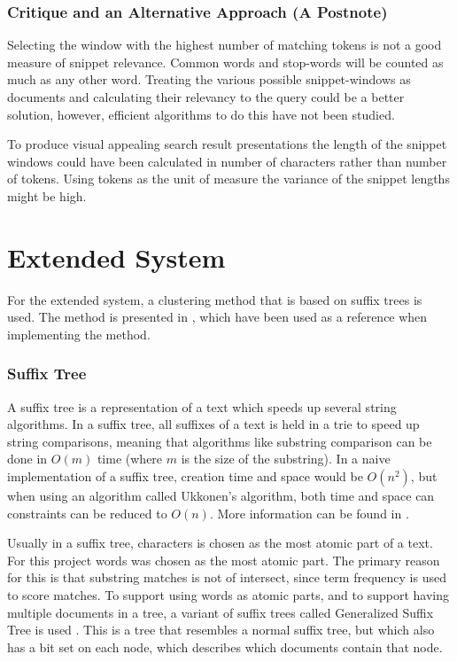 \subsubsection{Critique and an Alternative Approach (A Postnote)}
Selecting the window with the highest number of matching tokens is not a good measure of snippet relevance. Common words and stop-words will be counted as much as any other word. Treating the various possible snippet-windows as documents and calculating their relevancy to the query could be a better solution, however, efficient algorithms to do this have not been studied. 

To produce visual appealing search result presentations the length of the snippet windows could have been calculated in number of characters rather than number of tokens. Using tokens as the unit of measure the variance of the snippet lengths might be high. 

\section{Extended System}

For the extended system, a clustering method that is based on suffix trees is used. The method is presented in \cite{zamir}, which have been used as a reference when implementing the method.

\subsubsection{Suffix Tree} 

A suffix tree is a representation of a text which speeds up several string algorithms. In a suffix tree, all suffixes of a text is held in  a trie to speed up string comparisons, meaning that algorithms like substring comparison can be done in $O(m)$ time (where $m$ is the size of the substring). In a naive implementation of a suffix tree, creation time and space would be $O(n^2)$, but when using an algorithm called Ukkonen's algorithm, both time and space can constraints can be reduced to $O(n)$. More information can be found in \cite{suffixtreebook}.

Usually in a suffix tree, characters is chosen as the most atomic part of a text. For this project words was chosen as the most atomic part. The primary reason for this is that substring matches is not of intersect, since term frequency is used to score matches. To support using words as atomic parts, and to support having multiple documents in a tree, a variant of suffix trees called Generalized Suffix Tree is used . This is a tree that resembles a normal suffix tree, but which also has a bit set on each node, which describes which documents contain that node. 

